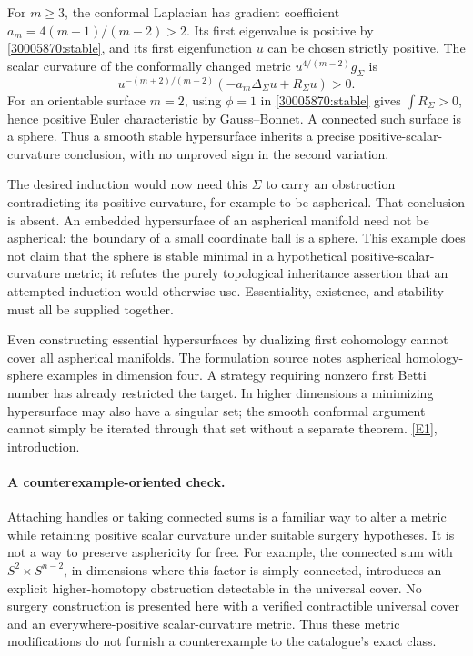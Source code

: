 \documentclass[11pt,a4paper]{article}
\newcommand{\eref}[2]{\hyperlink{extra:#1:#2}{[E#2]}}
\numberwithin{equation}{section}
\begin{document}
For $m\geq3$, the conformal Laplacian has gradient coefficient
$a_m=4(m-1)/(m-2)>2$.  Its first eigenvalue is positive by
\eqref{30005870:stable}, and its first eigenfunction $u$ can be chosen
strictly positive.  The scalar curvature of the conformally changed
metric $u^{4/(m-2)}g_\Sigma$ is
\[
 u^{-(m+2)/(m-2)}(-a_m\Delta_\Sigma u+R_\Sigma u)>0.
\]
For an orientable surface $m=2$, using $\phi=1$ in
\eqref{30005870:stable} gives $\int R_\Sigma>0$, hence positive Euler
characteristic by Gauss--Bonnet.  A connected such surface is a sphere.
Thus a smooth stable hypersurface inherits a precise positive-scalar-
curvature conclusion, with no unproved sign in the second variation.

The desired induction would now need this $\Sigma$ to carry an
obstruction contradicting its positive curvature, for example to be
aspherical.  That conclusion is absent.  An embedded hypersurface of
an aspherical manifold need not be aspherical: the boundary of a small
coordinate ball is a sphere.  This example does not claim that the
sphere is stable minimal in a hypothetical positive-scalar-curvature
metric; it refutes the purely topological inheritance assertion that
an attempted induction would otherwise use.  Essentiality, existence,
and stability must all be supplied together.

Even constructing essential hypersurfaces by dualizing first cohomology
cannot cover all aspherical manifolds.  The formulation source notes
aspherical homology-sphere examples in dimension four.  A strategy
requiring nonzero first Betti number has already restricted the target.
In higher dimensions a minimizing hypersurface may also have a singular
set; the smooth conformal argument cannot simply be iterated through
that set without a separate theorem. \eref{30005870}{1}, introduction.

\paragraph{A counterexample-oriented check.}
Attaching handles or taking connected sums is a familiar way to alter
a metric while retaining positive scalar curvature under suitable
surgery hypotheses.  It is not a way to preserve asphericity for free.
For example, the connected sum with $S^2\times S^{n-2}$, in dimensions
where this factor is simply connected, introduces an explicit
higher-homotopy obstruction detectable in the universal cover.
No surgery construction is presented here with a verified contractible
universal cover and an everywhere-positive scalar-curvature metric.
Thus these metric modifications do not furnish a counterexample to the
catalogue's exact class.
\end{document}
